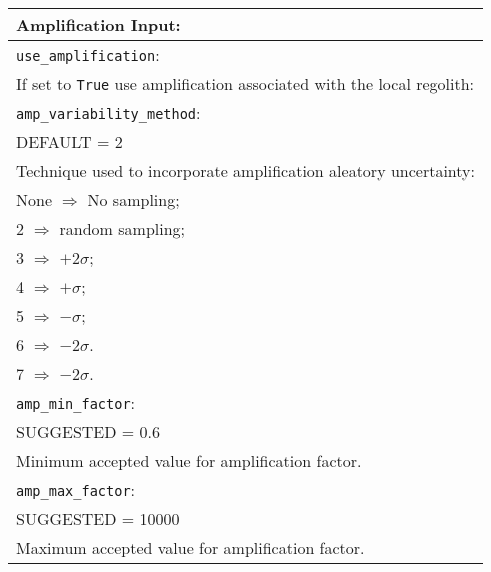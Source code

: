 \documentclass[a4paper, 12pt]{report}
\begin{document}
\vspace{2em}
\begin{tabular}{|p{\textwidth}|}
\hline
\vspace{0.3em} \noindent \Large \textbf{Amplification Input:} \normalsize \\
\hline \vspace{0.1em} \texttt{use\_amplification}: \\
If set to \texttt{True} use amplification associated with the local regolith: \\
\hline \vspace{0.1em} \texttt{amp\_variability\_method}: \\
DEFAULT = 2 \\
Technique used to incorporate amplification aleatory uncertainty: \\
 \hspace{0.5em} None $\Rightarrow$ No sampling; \\
 \hspace{0.5em} 2 $\Rightarrow$ random sampling; \\
 \hspace{0.5em} 3 $\Rightarrow$ $+2\sigma$; \\
 \hspace{0.5em} 4 $\Rightarrow$ $+\sigma$; \\
 \hspace{0.5em} 5 $\Rightarrow$ $-\sigma$; \\
 \hspace{0.5em} 6 $\Rightarrow$ $-2\sigma$.\\
 \hspace{0.5em} 7 $\Rightarrow$ $-2\sigma$.\\
\hline \vspace{0.1em} \texttt{amp\_min\_factor}: \\
SUGGESTED = 0.6 \\
Minimum accepted value for amplification factor.    \\
\hline \vspace{0.1em} \texttt{amp\_max\_factor}: \\
SUGGESTED = 10000 \\
Maximum accepted value for amplification factor.   \\
\hline
\end{tabular}
\end{document}
